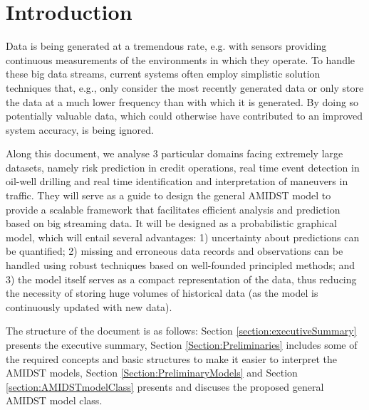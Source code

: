 \section{Introduction}


Data is being generated at a tremendous rate, e.g. with sensors providing continuous measurements of the environments in which they operate. To handle these big data streams, current systems often employ simplistic solution techniques that, e.g., only consider the most recently generated data or only store the data at a much lower frequency than with which it is generated. By doing so potentially valuable data, which could otherwise have contributed to an improved system accuracy, is being ignored. 

Along this document, we analyse 3 particular domains facing extremely large datasets, namely risk prediction in credit operations, real time event detection in oil-well drilling and real time identification and interpretation of maneuvers in traffic. They will serve as a guide to design the general AMIDST model to provide a scalable framework that facilitates efficient analysis and prediction based on big streaming data. It will be designed as a probabilistic graphical model, which will entail several advantages: 1) uncertainty about predictions can be quantified; 2) missing and erroneous data records and observations can be handled using robust techniques based on well-founded principled methods; and 3) the model itself serves as a compact representation of the data, thus reducing the necessity of storing huge volumes of historical data (as the model is continuously updated with new data).


The structure of the document is as follows: Section \ref{section:executiveSummary} presents the executive summary, Section \ref{Section:Preliminaries} includes some of the required concepts and basic structures to make it easier to interpret the AMIDST models, Section \ref{Section:PreliminaryModels} and Section \ref{section:AMIDSTmodelClass} presents and discuses the proposed general AMIDST model class.